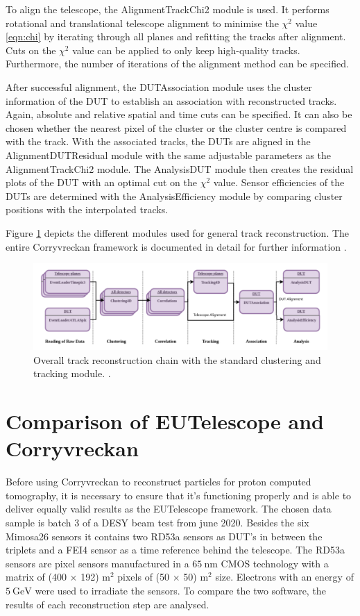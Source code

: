 To align the telescope, the AlignmentTrackChi2 module is used. It performs rotational and translational telescope
alignment to minimise the $\chi^2$ value \ref{eqn:chi} by iterating through all planes and refitting the tracks after alignment. Cuts on the $\chi^2$ value can be
applied to only keep high-quality tracks. Furthermore, the number of iterations of the alignment method can be specified.

After successful alignment, the DUTAssociation module uses the cluster information of the DUT to establish an association with reconstructed tracks. Again, absolute
and relative spatial and time cuts can be specified. It can also be chosen whether the nearest pixel of the cluster or the cluster centre is compared with the track.
With the associated tracks, the DUTs are aligned in the AlignmentDUTResidual module with the same adjustable parameters as the AlignmentTrackChi2 module.
The AnalysisDUT module then creates the residual plots of the DUT with an optimal cut on the $\chi^2$ value. Sensor efficiencies of the DUTs are determined with the
AnalysisEfficiency module by comparing cluster positions with the interpolated tracks.


Figure \ref{fig:corry_track_reco} depicts
the different modules used for general track reconstruction. The entire Corryvreckan framework is documented in detail for further information \cite{corry_manual}.

\begin{figure}
  \centering
  \includegraphics[height=0.3\textwidth]{images/corry.png}
  \caption{Overall track reconstruction chain with the standard clustering and tracking module. \cite{corry_track_reco}.}
  \label{fig:corry_track_reco}
\end{figure}

\chapter{Comparison of EUTelescope and Corryvreckan}\label{make}
Before using Corryvreckan to reconstruct particles for proton computed tomography, it is necessary to ensure that it's functioning properly
and is able to deliver equally valid results as the EUTelescope framework.
The chosen data sample is batch 3 of a DESY beam test from june 2020. Besides the six Mimosa26 sensors it contains two RD53a sensors
as DUT's in between the triplets and a FEI4 sensor as a time reference behind the telescope. The RD53a sensors are pixel sensors
manufactured in a $\SI{65}{\nano\meter}$ CMOS technology with a matrix of (400 $\times$ 192) \textmu m$^2$ pixels of
(50 $\times$ 50) \textmu m$^2$ size. Electrons with an energy of $\SI{5}{\GeV}$ were used to irradiate the sensors.
To compare the two software, the results of each
reconstruction step are analysed. \\

